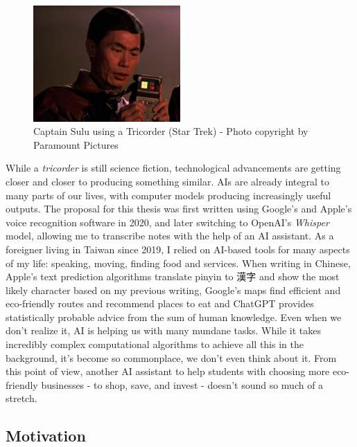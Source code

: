 \documentclass[
  letterpaper,
  DIV=11,
  numbers=noendperiod]{scrartcl}
\begin{document}
\begin{figure}[H]

{\centering \includegraphics[width=0.5\textwidth,height=\textheight]{./images/introduction/tricorder.jpg}

}

\caption{Captain Sulu using a Tricorder (Star Trek) - Photo copyright by
Paramount Pictures}

\end{figure}%

While a \emph{tricorder} is still science fiction, technological
advancements are getting closer and closer to producing something
similar. AIs are already integral to many parts of our lives, with
computer models producing increasingly useful outputs. The proposal for
this thesis was first written using Google's and Apple's voice
recognition software in 2020, and later switching to OpenAI's
\emph{Whisper} model, allowing me to transcribe notes with the help of
an AI assistant. As a foreigner living in Taiwan since 2019, I relied on
AI-based tools for many aspects of my life: speaking, moving, finding
food and services. When writing in Chinese, Apple's text prediction
algorithms translate pinyin to 漢字 and show the most likely character
based on my previous writing, Google's maps find efficient and
eco-friendly routes and recommend places to eat and ChatGPT provides
statistically probable advice from the sum of human knowledge. Even when
we don't realize it, AI is helping us with many mundane tasks. While it
takes incredibly complex computational algorithms to achieve all this in
the background, it's become so commonplace, we don't even think about
it. From this point of view, another AI assistant to help students with
choosing more eco-friendly businesses - to shop, save, and invest -
doesn't sound so much of a stretch.

\subsection{Motivation}\label{motivation}
\end{document}

